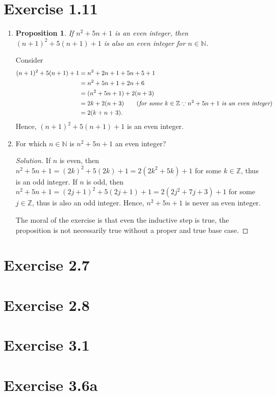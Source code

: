 \documentclass{article}
\newtheorem{proposition}[thm]{Proposition}
\begin{document}
\section*{Exercise 1.11}
\begin{enumerate}[label=(\alph*)]
    \item \begin{proposition}
        If $n^2 + 5n + 1$ is an even integer, then $(n+1)^2 + 5(n+1) + 1$ is also an even integer 
        for $n \in \mathbb{N}$.
    \end{proposition}

    Consider 
    \begin{align*}
        (n+1)^2 + 5(n+1) + 1 & = n^2 + 2n + 1 + 5n + 5 + 1 \\
        & = n^2 + 5n + 1 + 2n + 6 \\
        & = (n^2 + 5n + 1) + 2(n+3) \\
        & = 2k + 2(n+3) \qquad (\emph{for some } k \in \mathbb{Z} \because \emph{$n^2 + 5n + 1$ is 
        an even integer}) \\
        & = 2(k + n + 3).
    \end{align*}
    Hence, $(n+1)^2 + 5(n+1) + 1$ is an even integer.

    \item For which $n \in \mathbb{N}$ is $n^2 + 5n + 1$ an even integer?
    \begin{proof}[Solution]
        If $n$ is even, then $n^2 + 5n + 1 = (2k)^2 + 5(2k) + 1 = 2(2k^2 + 5k) + 1$ for some $k \in 
        \mathbb{Z}$, thus is an odd integer. If $n$ is odd, then $n^2 + 5n + 1 = (2j+1)^2 + 5(2j+1)
        + 1 = 2(2j^2 + 7j + 3) + 1$ for some $j \in \mathbb{Z}$, thus is also an odd integer. 
        Hence, $n^2 + 5n + 1$ is never an even integer.

        The moral of the exercise is that even the inductive step is true, the proposition is not
        necessarily true without a proper and true base case.
    \end{proof}
\end{enumerate}
\bigbreak

\section*{Exercise 2.7}

\bigbreak

\section*{Exercise 2.8}

\bigbreak

\section*{Exercise 3.1}

\bigbreak

\section*{Exercise 3.6a}
\end{document}
